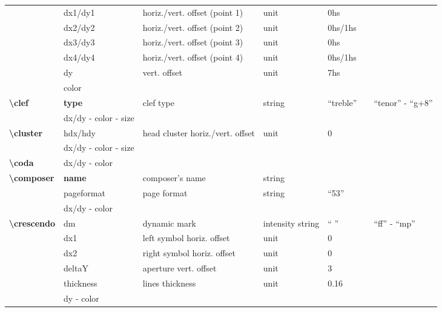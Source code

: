 \documentclass[a4paper, landscape, 10pt]{article}
\begin{document}
\begin{tabularx}{\linewidth}{p{3cm}p{3cm}p{6cm}p{2.5cm}p{2.5cm}p{3.5cm}p{3.5cm}}
    &dx1/dy1&horiz./vert. offset (point 1)&unit&0hs&&\\
    &dx2/dy2&horiz./vert. offset (point 2)&unit&0hs/1hs&&\\
    &dx3/dy3&horiz./vert. offset (point 3)&unit&0hs&&\\
    &dx4/dy4&horiz./vert. offset (point 4)&unit&0hs/1hs&&\\
    &dy&vert. offset&unit&7hs&&\\
    &color&&&&&\\
    \hline
    \textbf{\textbackslash{}clef}&\textbf{type}&clef type&string&``treble''&&``tenor'' - ``g+8''\\
    &dx/dy - color - size&&&&&\\
    \hline
    \textbf{\textbackslash{}cluster}&hdx/hdy&head cluster horiz./vert. offset&unit&0&&\\
    &dx/dy - color - size&&&&&\\
    \hline
    \textbf{\textbackslash{}coda}&dx/dy - color&&&&&\\
    \hline
    \textbf{\textbackslash{}composer}&\textbf{name}&composer's name&string&&&\\
    &pageformat&page format&string&``53''&&\\ %
    &dx/dy - color&&&&&\\
    \hline
    \textbf{\textbackslash{}crescendo}&dm&dynamic mark&intensity string&`` ''&&``ff'' - ``mp''\\
    &dx1&left symbol horiz. offset&unit&0&&\\
    &dx2&right symbol horiz. offset&unit&0&&\\
    &deltaY&aperture vert. offset&unit&3&&\\
    &thickness&lines thickness&unit&0.16&&\\
	&dy - color&&&&&\\
    \hline
\end{tabularx}
\end{document}
